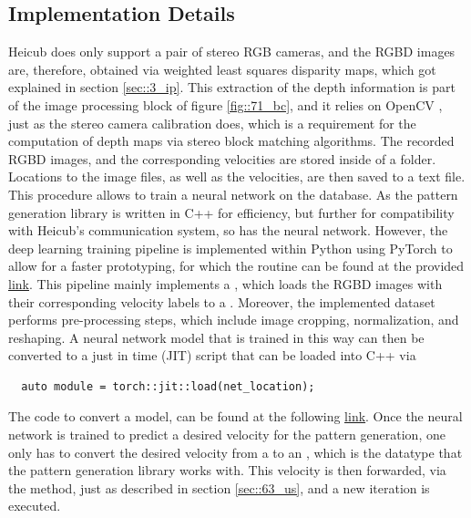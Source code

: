 \subsection{Implementation Details}
\label{sec::712_id}
Heicub does only support a pair of stereo RGB cameras, and the RGBD images are, therefore, obtained via weighted least squares disparity maps, which got explained in section \ref{sec::3_ip}. This extraction of the depth information is part of the image processing block of figure \ref{fig::71_bc}, and it relies on OpenCV \cite{opencv_library}, just as the stereo camera calibration does, which is a requirement for the computation of depth maps via stereo block matching algorithms. The recorded RGBD images, and the corresponding velocities are stored inside of a folder. Locations to the image files, as well as the velocities, are then saved to a text file. This procedure allows to train a neural network on the database. As the pattern generation library is written in C++ for efficiency, but further for compatibility with Heicub's communication system, so has the neural network. However, the deep learning training pipeline is implemented within Python using PyTorch \cite{paszke2017automatic} to allow for a faster prototyping, for which the routine can be found at the provided \href{https://github.com/mhubii/nmpc_pattern_generator/blob/master/libs/learning/python/train_rgbd.py}{\underline{link}}. This pipeline mainly implements a , which loads the RGBD images with their corresponding velocity labels to a . Moreover, the implemented dataset performs pre-processing steps, which include image cropping, normalization, and reshaping. A neural network model that is trained in this way can then be converted to a just in time (JIT) script that can be loaded into C++ via
\begin{verbatim}
  auto module = torch::jit::load(net_location);
\end{verbatim}
The code to convert a model, can be found at the following \href{https://github.com/mhubii/nmpc_pattern_generator/blob/master/libs/learning/python/python_to_cpp.py}{\underline{link}}. Once the neural network is trained to predict a desired velocity for the pattern generation, one only has to convert the desired velocity from a  to an , which is the datatype that the pattern generation library works with. This velocity is then forwarded, via the  method, just as described in section \ref{sec::63_us}, and a new iteration is executed.
